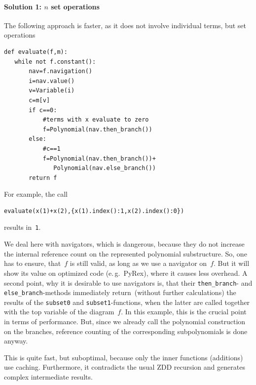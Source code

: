 \paragraph{Solution 1: $n$ set operations}
The following approach is faster, as it does not involve individual terms, but set operations

\begin{lstlisting}
def evaluate(f,m):
   while not f.constant():
       nav=f.navigation()
       i=nav.value()
       v=Variable(i)
       c=m[v]
       if c==0:
           #terms with x evaluate to zero
           f=Polynomial(nav.then_branch())
       else:
           #c==1
           f=Polynomial(nav.then_branch())+
              Polynomial(nav.else_branch())
       return f   
\end{lstlisting}
For example, the call
\begin{lstlisting}
evaluate(x(1)+x(2),{x(1).index():1,x(2).index():0})  
\end{lstlisting}
results in~\lstinline|1|.



We deal here with navigators, which is dangerous, because
they do not increase the internal reference count on the represented polynomial
substructure. So, one has
to ensure, that~$f$ is still valid, as long as we use a navigator on~$f$.
But it will show its value on optimized code (e.\,g.\ PyRex), where it causes
less overhead. 
A second point, why it is desirable to use navigators is, that their
\lstinline|then_branch|- and \lstinline|else_branch|-methods immediately return~(without
further calculations) the
results of the \lstinline|subset0| and \lstinline|subset1|-functions, when the latter are
called together  with the top variable of the diagram~$f$.
%
In this example, this is the crucial point in terms of performance.
But, since we already call the polynomial construction on the branches,
reference counting of the corresponding subpolynomials is done anyway.

This is quite fast, but suboptimal, because only the inner functions (additions) use caching.
%
Furthermore, it contradicts the usual ZDD recursion and generates complex intermediate results.

